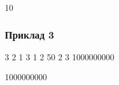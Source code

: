 \documentclass[12pt,a4paper]{article}
\begin{document}
\textbf{}

\begin{codeblock}
10
\end{codeblock}


\subsubsection*{Приклад 3}

\textbf{}

\begin{codeblock}
3 2
1 3
1 2 50
2 3 1000000000
\end{codeblock}

\textbf{}

\begin{codeblock}
1000000000
\end{codeblock}
\end{document}
